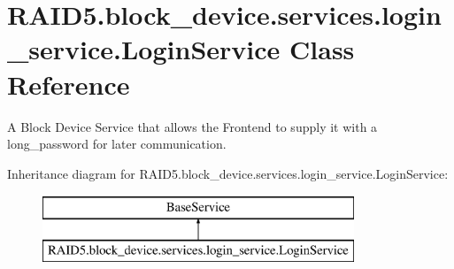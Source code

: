 \hypertarget{class_r_a_i_d5_1_1block__device_1_1services_1_1login__service_1_1_login_service}{}\section{R\+A\+I\+D5.\+block\+\_\+device.\+services.\+login\+\_\+service.\+Login\+Service Class Reference}
\label{class_r_a_i_d5_1_1block__device_1_1services_1_1login__service_1_1_login_service}


A Block Device Service that allows the Frontend to supply it with a long\+\_\+password for later communication.  


Inheritance diagram for R\+A\+I\+D5.\+block\+\_\+device.\+services.\+login\+\_\+service.\+Login\+Service\+:\begin{figure}[H]
\begin{center}
\leavevmode
\includegraphics[height=2.000000cm]{class_r_a_i_d5_1_1block__device_1_1services_1_1login__service_1_1_login_service}
\end{center}
\end{figure}

